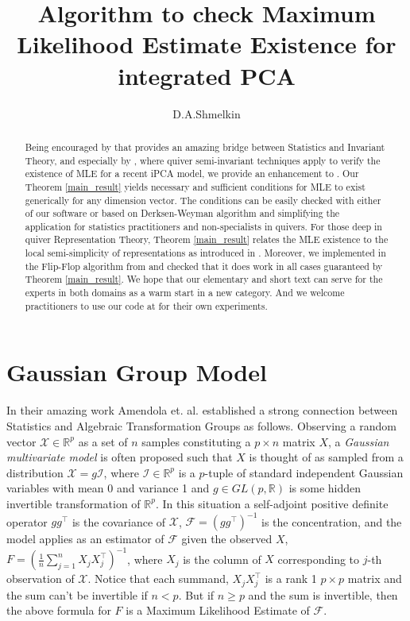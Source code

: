 \documentclass[reqno]{amsart}
\theoremstyle{plain}
\theoremstyle{definition}
\theoremstyle{remark}
\newcommand{\Chi}{\mathcal X}
\newcommand{\Rl}{\mathbb R}
\begin{document}
\title[MLE Existence Algorithm]{Algorithm to check Maximum Likelihood Estimate Existence for integrated PCA}
\author{D.A.Shmelkin}
\begin{abstract}
Being encouraged by \cite{am} that provides an amazing bridge between Statistics and Invariant Theory, and especially by \cite{fm}, where quiver semi-invariant techniques apply to verify the existence of MLE for a recent iPCA model, we provide an enhancement to \cite{fm}. Our  Theorem \ref{main_result}  yields necessary and sufficient conditions for MLE to exist generically for any dimension vector. The conditions can be easily checked with either of our software \cite{t} or \cite{ff} based on Derksen-Weyman algorithm and simplifying the application for statistics practitioners and non-specialists in quivers. For those deep in quiver Representation Theory, Theorem \ref{main_result} relates the MLE existence to the local semi-simplicity of representations as introduced in \cite{sh07}. Moreover, we implemented in \cite{ff} the Flip-Flop algorithm from \cite{ta} and checked that it does work in all cases guaranteed by Theorem \ref{main_result}. We hope that our elementary and short text can serve for the experts in both domains as a warm start in a new category. And we welcome practitioners to use our code at \cite{ff} for their own experiments.
\end{abstract}
\maketitle
\tableofcontents

\section{Gaussian Group Model}
In their amazing work \cite{am} Amendola et. al. established a strong connection between Statistics and Algebraic Transformation Groups as follows. Observing a random vector $\Chi\in \Rl^p$ as a set of $n$ samples constituting a $p\times n$ matrix $X$, a {\it Gaussian multivariate model} is often proposed such that  $X$ is thought of as sampled from a distribution $\Chi = g {\mathcal I}$, where ${\mathcal I}\in \Rl^p$ is a $p$-tuple of standard independent Gaussian variables with mean 0 and variance 1 and $g\in GL(p,\Rl)$ is some hidden invertible transformation of $\Rl ^p$.
In this situation a self-adjoint positive definite operator $gg^\top$ is the covariance of $\Chi$, ${\mathcal F}=(gg^\top)^{-1}$ is the concentration, and the model applies as an estimator of ${\mathcal F}$ given the observed $X$, $F=(\frac{1}{n}\sum_{j=1}^n X_j X_j^{\top})^{-1}$, where $X_j$ is the column of $X$ corresponding to $j$-th observation of $\Chi$. Notice that each summand, $X_j X_j^{\top}$ is a rank 1 $p\times p$ matrix and the sum can't be invertible if $n<p$. But if $n\geq p$ and the sum is invertible, then the above formula for $F$ is a Maximum Likelihood Estimate of ${\mathcal F}$.
\end{document}
